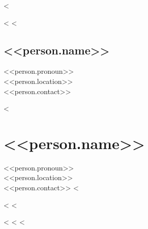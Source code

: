 <%



<%
  <%
    \begin{paracol}{2}
    \begin{leftcolumn}
    \noindent
    \end{leftcolumn}

    \begin{rightcolumn}
    \section{<<person.name>>}
    \vspace{-1em}
    <<person.pronoun>>\\
    <<person.location>>\\
    <<person.contact>>
    \end{rightcolumn}
    \end{paracol}
  <%
    \section{<<person.name>>}
    \vspace{-1em}
    <<person.pronoun>>\\
    <<person.location>>\\
    <<person.contact>>
<%


\begin{paracol}{2}
\begin{leftcolumn}
<%
<%
\end{leftcolumn}

\begin{rightcolumn}
<%
<%
<%
\end{rightcolumn}
\end{paracol}

